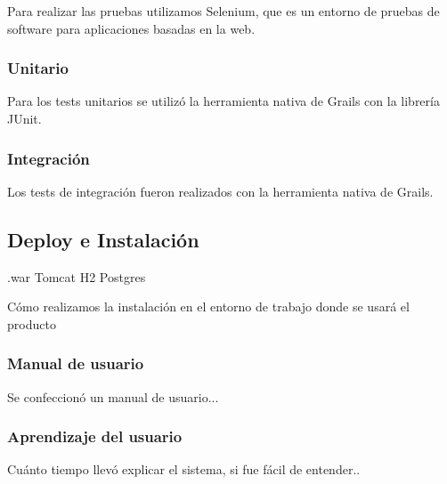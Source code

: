Para realizar las pruebas utilizamos Selenium, que es un entorno de pruebas de software para aplicaciones basadas en la web. 

\subsubsection{Unitario}
Para los tests unitarios se utilizó la herramienta nativa de Grails con la librería JUnit.
\subsubsection{Integración}
Los tests de integración fueron realizados con la herramienta nativa de Grails. 
\subsection{Deploy e Instalación}
.war
Tomcat
H2
Postgres

Cómo realizamos la instalación en el entorno de trabajo donde se usará el producto
\subsubsection{Manual de usuario}
Se confeccionó un manual de usuario...
\subsubsection{Aprendizaje del usuario}
Cuánto tiempo llevó explicar el sistema, si fue fácil de entender..